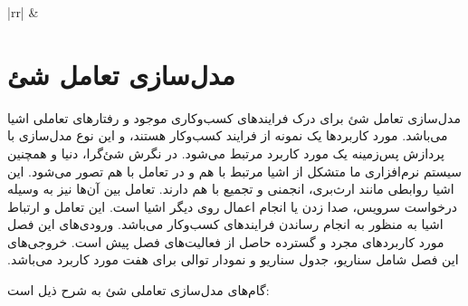 \documentclass[12pt]{article}
\begin{document}
\begin{center}
\begin{table}[H]
\begin{tabular}{|rr|}
				                &                                                                                                                                                         \\ \hline

			\end{tabular}
		\end{table}
	\end{center}
	\newpage

	\section{مدل‌سازی تعامل شئ}
	‫مدل‬‫‌سازی ‬‫تعامل‬ ‫شئ‬ ‫برای‬ ‫درک‬ ‫فرایندهای‬ ‫کسب‌و‬کاری‬ ‫موجود‬ ‫و‬ ‫رفتارهای‬ ‫تعاملی‬ ‫اشیا‬ ‫می‌باشد‪.‬‬‫ مورد‬ ‫کاربردها‬ ‫یک ‬‫نمونه‬ ‫از‬ ‫فرایند‬ ‫کسب‌و‫کار‬ ‫هستند‪،‬‬ ‫و این‬ ‫نوع‬ ‫مدل‌سازی ‬‫با‬ ‫پردازش‬ ‫پس‌زمینه ‬‫یک‬ ‫مورد‬ ‫کاربرد‬ ‫مرتبط‬ ‫می‌شود‪.‬‬ ‫در‬‫ نگرش‬ ‫شئ‌گرا، دنیا‬ ‫و‬ ‫همچنین ‬‫سیستم‬ ‫نرم‬‌‫افزاری ‬‫ما‬ ‫متشکل‬ ‫از‬ ‫اشیا ‫مرتبط‬ ‫با‌ هم‬ ‫و‬ ‫در‬ ‫تعامل‬ ‫با هم‬ ‫تصور‬ ‫می‌شود. این‬ ‫اشیا‬ ‫روابطی‬ ‫مانند‬ ‫ارث‌بری، انجمنی و تجمیع ‫با هم‬ ‫دارند‪.‬‬ ‫تعامل‬ ‫بین‬ ‫آن‌ها‬ ‫نیز‬ ‫به‬ ‫وسیله‬ ‬‫درخواست‬ ‫سرویس‪،‬‬‫ صدا‬ ‫زدن‬ ‫یا‬ ‫انجام‬ ‫اعمال‬ ‫روی‬ ‫دیگر‬ ‫اشیا‬ ‫است‪.‬‬ ‫این‬ ‫تعامل‬ ‫و‬ ‫ارتباط‬ ‫اشیا‬ ‫به‬ ‫منظور‬ ‫به‬ ‫انجام‬ ‫رساندن‬ ‫فرایندهای‬‫ کسب‌و‌کار‬ ‫می‬‌‫باشد‬‫‪.‬‬ ‫ورودی‬‫‌های ‬‫این‬ ‫فصل‬ ‫مورد‬ ‫کاربردهای ‬‫مجرد‬ ‫و‬ ‫گسترده‬ ‫حاصل‬ ‫از‬ ‫فعالیت‌های‬‫ فصل‬ ‫پیش ‬‫است‪.‬‬ ‫خروجی‌های ‬‫این‬ ‫فصل‬ ‫شامل‬ ‫سناریو‪،‬‬ ‫جدول‬ ‫سناریو‬ ‫و‬ ‫نمودار‬ ‫توالی‬ ‫برای‬ هفت ‫مورد‬ ‫کاربرد‬ ‫می‌باشد‬‫‪.‬‬

	‫گام‬‫‌های ‬‫مدل‬‌سازی ‬‫تعاملی‬ ‫شئ‬ ‫به‬ ‫شرح‬ ‫ذیل‬ ‫است‬:
\end{document}
